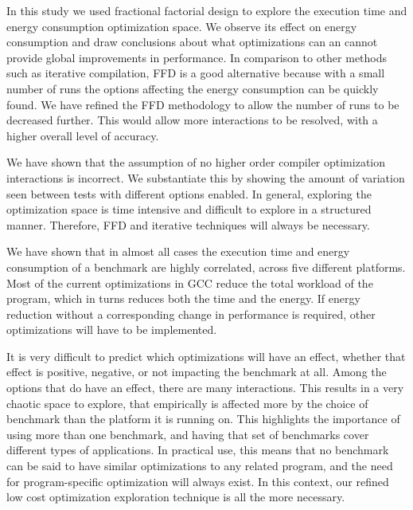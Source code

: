 \documentclass[twocolumn]{article}
\newcommand{\todo}[1]{\textbf{\textcolor{red}{#1}}}
\begin{document}
In this study we used fractional factorial design to explore the  execution time and energy consumption optimization space. We observe its effect on energy consumption and draw conclusions about what optimizations can an cannot provide global improvements in performance. In comparison to other methods such as iterative compilation, FFD is a good alternative because with a small number of runs the options affecting the energy consumption can be quickly found. We have refined the FFD methodology to allow the number of runs to be decreased further. This would allow more interactions to be resolved, with a higher overall level of accuracy.

We have shown that the assumption of no higher order compiler optimization interactions is incorrect. We substantiate this by showing the amount of variation seen between tests with different options enabled. In general, exploring the optimization space is time intensive and difficult to explore in a structured manner. Therefore, FFD and iterative techniques will always be necessary.

We have shown that in almost all cases the execution time and energy consumption of a benchmark are highly correlated, across five different platforms. Most of the current optimizations in GCC reduce the total workload of the program, which in turns reduces both the time and the energy. If energy reduction without a corresponding change in performance is required, other optimizations will have to be implemented.

It is very difficult to predict which optimizations will have an effect, whether that effect is positive, negative, or not impacting the benchmark at all. Among the options that do have an effect, there are many interactions. This results in a very chaotic space to explore, that empirically is affected more by the choice of benchmark than the platform it is running on. This highlights the importance of using more than one benchmark, and having that set of benchmarks cover different types of applications. In practical use, this means that no benchmark can be said to have similar optimizations to any related program, and the need for program-specific optimization will always exist. In this context, our refined low cost optimization exploration technique is all the more necessary.
\end{document}
